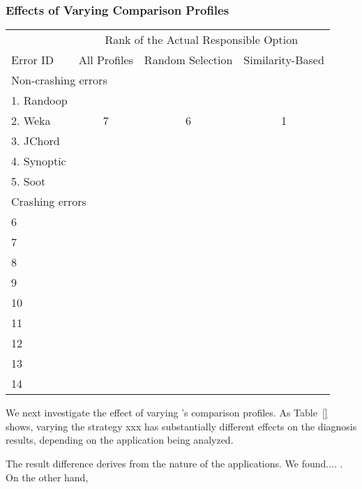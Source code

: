 \subsubsection{Effects of Varying Comparison Profiles}
\label{sec:ranking}


\begin{table}[t]
\setlength{\tabcolsep}{.24\tabcolsep}
\begin{tabular}{|l|c|c||c|}
\hline
  & \multicolumn{3}{|c|}{Rank of the Actual Responsible Option } \\
\cline{2-4}
 Error ID & All Profiles & Random Selection&  Similarity-Based\\
 \hline
\hline
\multicolumn{4}{|l|}{Non-crashing errors}   \\
 \hline
 1. Randoop & & &\\
 2. Weka & 7 & 6 & 1\\
 3. JChord & & &\\
 4. Synoptic & & &\\
 5. Soot & & &\\
\hline
\hline
\multicolumn{4}{|l|}{Crashing errors}   \\
\hline
 6 & & &\\
 7 & & &\\
 8 & & &\\
 9 & & &\\
 10 & & &\\
 11 & & &\\
 12 & & &\\
 13 & & &\\
 14 & & &\\
\hline
\end{tabular}

\end{table}


We next investigate the effect of varying \ourtool's
comparison profiles. As Table~\ref{} shows, varying the
strategy xxx has substantially different effects on the
diagnosis results, depending on the application being analyzed.

The result difference derives from the nature of the applications.
We found....  . On the other hand,


